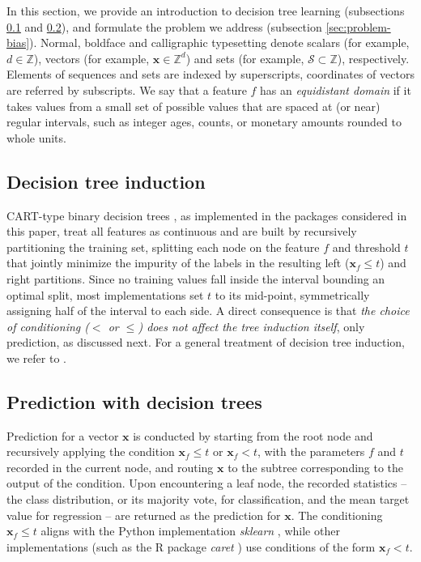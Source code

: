 \documentclass[5p,twocolumn,authoryear]{elsarticle}
\theoremstyle{plain}%
\theoremstyle{remark}%
\theoremstyle{definition}%
\begin{document}
In this section, we provide an introduction to decision tree learning (subsections \ref{sec:problem-intro} and \ref{sec:problem-split}), and formulate the problem we address (subsection \ref{sec:problem-bias}).
Normal, boldface and calligraphic typesetting denote scalars (for example, $d \in\mathbb{Z}$), vectors (for example, $\mathbf{x}\in\mathbb{Z}^d$) and sets (for example, $\mathcal{S}\subset\mathbb{Z}$), respectively. Elements of sequences and sets are indexed by superscripts, coordinates of vectors are referred by subscripts.
We say that a feature $f$ has an \emph{equidistant domain} if it takes values from a small set of possible values that are spaced at (or near) regular intervals, such as integer ages, counts, or monetary amounts rounded to whole units.

\subsection{Decision tree induction}
\label{sec:problem-intro}

CART-type binary decision trees \citep{cart}, as implemented in the packages considered in this paper, treat all features as continuous and are built by recursively partitioning the training set, splitting each node on the feature $f$ and threshold $t$ that jointly minimize the impurity of the labels in the resulting left ($\mathbf{x}_f \leq t$) and right partitions. Since no training values fall inside the interval bounding an optimal split, most implementations set $t$ to its mid-point, symmetrically assigning half of the interval to each side. A direct consequence is that \emph{the choice of conditioning ($<$ or $\leq$) does not affect the tree induction itself}, only prediction, as discussed next. For a general treatment of decision tree induction, we refer to \citep{treebook}.

\subsection{Prediction with decision trees}
\label{sec:problem-split}

Prediction for a vector $\mathbf{x}$ is conducted by starting from the root node and recursively applying the condition $\mathbf{x}_{f} \leq t$ or $\mathbf{x}_{f} < t$, with the parameters $f$ and $t$ recorded in the current node, and routing $\mathbf{x}$ to the subtree corresponding to the output of the condition. Upon encountering a leaf node, the recorded statistics -- the class distribution, or its majority vote, for classification, and the mean target value for regression -- are returned as the prediction for $\mathbf{x}$.
The conditioning $\mathbf{x}_f\leq t$ aligns with the Python implementation \emph{sklearn} \citep{sklearn}, while other implementations (such as the R package \emph{caret} \citep{caret}) use conditions of the form $\mathbf{x}_{f} < t$.
\end{document}
